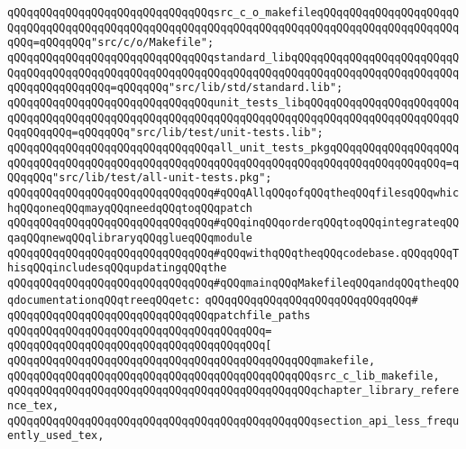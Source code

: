 \verb|qQQqqQQqqQQqqQQqqQQqqQQqqQQqqQQqsrc_c_o_makefileqQQqqQQqqQQqqQQqqQQqqQQqqQQqqQQqqQQqqQQqqQQqqQQqqQQqqQQqqQQqqQQqqQQqqQQqqQQqqQQqqQQqqQQqqQQqqQQq=qQQqqQQq"src/c/o/Makefile";|\newline
\newline
\verb|qQQqqQQqqQQqqQQqqQQqqQQqqQQqqQQqstandard_libqQQqqQQqqQQqqQQqqQQqqQQqqQQqqQQqqQQqqQQqqQQqqQQqqQQqqQQqqQQqqQQqqQQqqQQqqQQqqQQqqQQqqQQqqQQqqQQqqQQqqQQqqQQqqQQq=qQQqqQQq"src/lib/std/standard.lib";|\newline
\newline
\verb|qQQqqQQqqQQqqQQqqQQqqQQqqQQqqQQqunit_tests_libqQQqqQQqqQQqqQQqqQQqqQQqqQQqqQQqqQQqqQQqqQQqqQQqqQQqqQQqqQQqqQQqqQQqqQQqqQQqqQQqqQQqqQQqqQQqqQQqqQQqqQQq=qQQqqQQq"src/lib/test/unit-tests.lib";|\newline
\verb|qQQqqQQqqQQqqQQqqQQqqQQqqQQqqQQqall_unit_tests_pkgqQQqqQQqqQQqqQQqqQQqqQQqqQQqqQQqqQQqqQQqqQQqqQQqqQQqqQQqqQQqqQQqqQQqqQQqqQQqqQQqqQQqqQQq=qQQqqQQq"src/lib/test/all-unit-tests.pkg";|\newline
\newline
\verb|qQQqqQQqqQQqqQQqqQQqqQQqqQQqqQQq#qQQqAllqQQqofqQQqtheqQQqfilesqQQqwhichqQQqoneqQQqmayqQQqneedqQQqtoqQQqpatch|\newline
\verb|qQQqqQQqqQQqqQQqqQQqqQQqqQQqqQQq#qQQqinqQQqorderqQQqtoqQQqintegrateqQQqaqQQqnewqQQqlibraryqQQqglueqQQqmodule|\newline
\verb|qQQqqQQqqQQqqQQqqQQqqQQqqQQqqQQq#qQQqwithqQQqtheqQQqcodebase.qQQqqQQqThisqQQqincludesqQQqupdatingqQQqthe|\newline
\verb|qQQqqQQqqQQqqQQqqQQqqQQqqQQqqQQq#qQQqmainqQQqMakefileqQQqandqQQqtheqQQqdocumentationqQQqtreeqQQqetc:|\newline
\verb|qQQqqQQqqQQqqQQqqQQqqQQqqQQqqQQq#|\newline
\verb|qQQqqQQqqQQqqQQqqQQqqQQqqQQqqQQqpatchfile_paths|\newline
\verb|qQQqqQQqqQQqqQQqqQQqqQQqqQQqqQQqqQQqqQQq=|\newline
\verb|qQQqqQQqqQQqqQQqqQQqqQQqqQQqqQQqqQQqqQQq[|\newline
\verb|qQQqqQQqqQQqqQQqqQQqqQQqqQQqqQQqqQQqqQQqqQQqqQQqmakefile,|\newline
\verb|qQQqqQQqqQQqqQQqqQQqqQQqqQQqqQQqqQQqqQQqqQQqqQQqsrc_c_lib_makefile,|\newline
\verb|qQQqqQQqqQQqqQQqqQQqqQQqqQQqqQQqqQQqqQQqqQQqqQQqchapter_library_reference_tex,|\newline
\verb|qQQqqQQqqQQqqQQqqQQqqQQqqQQqqQQqqQQqqQQqqQQqqQQqsection_api_less_frequently_used_tex,|\newline
